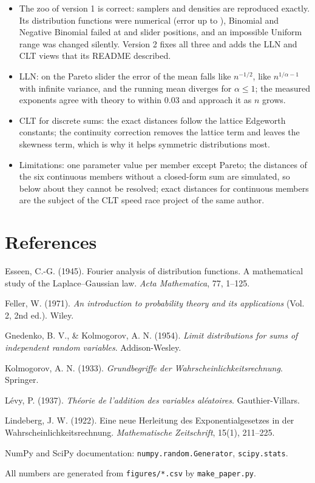 \documentclass[11pt,a4paper]{article}
\begin{document}
\begin{itemize}
  \item The zoo of version 1 is correct: samplers and densities are reproduced exactly. Its distribution functions were numerical
  (error up to \CdfErrPareto), Binomial and Negative Binomial failed at \BinomFails{} and \NegbinFails{} slider positions, and an
  impossible Uniform range was changed silently. Version 2 fixes all three and adds the LLN and CLT views that its README described.
  \item LLN: on the Pareto slider the error of the mean falls like $n^{-1/2}$, like $n^{1/\alpha-1}$ with infinite variance, and the
  running mean diverges for $\alpha \le 1$; the measured exponents agree with theory to within 0.03 and approach it as $n$ grows.
  \item CLT for discrete sums: the exact distances follow the lattice Edgeworth constants; the continuity correction removes the
  lattice term and leaves the skewness term, which is why it helps symmetric distributions most.
  \item Limitations: one parameter value per member except Pareto; the distances of the six continuous members without a closed-form
  sum are simulated, so below about \Noise{} they cannot be resolved; exact distances for continuous members are the subject of the
  CLT speed race project of the same author.
\end{itemize}

\section*{References}
{\small
\setlength{\parskip}{2pt}
\hangindent=1.27cm Esseen, C.-G. (1945). Fourier analysis of distribution functions. A mathematical study of the Laplace--Gaussian law. \textit{Acta
Mathematica}, 77, 1--125.\par
\hangindent=1.27cm Feller, W. (1971). \textit{An introduction to probability theory and its applications} (Vol. 2, 2nd ed.). Wiley.\par
\hangindent=1.27cm Gnedenko, B. V., \& Kolmogorov, A. N. (1954). \textit{Limit distributions for sums of independent random variables}. Addison-Wesley.\par
\hangindent=1.27cm Kolmogorov, A. N. (1933). \textit{Grundbegriffe der Wahrscheinlichkeitsrechnung}. Springer.\par
\hangindent=1.27cm Lévy, P. (1937). \textit{Théorie de l'addition des variables aléatoires}. Gauthier-Villars.\par
\hangindent=1.27cm Lindeberg, J. W. (1922). Eine neue Herleitung des Exponentialgesetzes in der Wahrscheinlichkeitsrechnung. \textit{Mathematische
Zeitschrift}, 15(1), 211--225.\par
\hangindent=1.27cm NumPy and SciPy documentation: \texttt{numpy.random.Generator}, \texttt{scipy.stats}.\par

\smallskip
All numbers are generated from
\texttt{figures/*.csv} by \texttt{make\_paper.py}.
}
\end{document}
